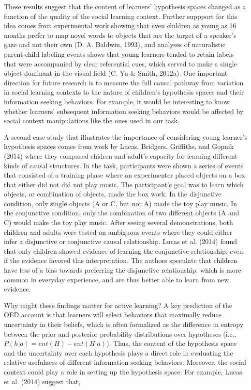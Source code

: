 \documentclass[english,floatsintext,man]{apa6}
\newcounter{author}
\theoremstyle{definition}
\theoremstyle{definition}
\theoremstyle{definition}
\theoremstyle{remark}
\begin{document}
These results suggest that the content of learners' hypothesis spaces
changed as a function of the quality of the social learning context.
Further suppport for this idea comes from experimental work showing that
even children as young as 16 months prefer to map novel words to objects
that are the target of a speaker's gaze and not their own (D. A.
Baldwin, 1993), and analyses of naturalistic parent-child labeling
events shows that young learners tended to retain labels that were
accompanied by clear referential cues, which served to make a single
object dominant in the visual field (C. Yu \& Smith, 2012a). One
important direction for future research is to measure the full causal
pathway from variation in social learning contexts to the nature of
children's hypothesis spaces and their information seeking behaviors.
For example, it would be interesting to know whether learners'
subsequent information seeking behaviors would be affected by social
context manipulations like the ones used in our task.

A second case study that illustrates the importance of considering young
learner's hypothesis spaces comes from work by Lucas, Bridgers,
Griffiths, and Gopnik (2014) where they compared chidren and adult's
capacity for learning different kinds of causal structures. In the task,
participants were shown a series of events that consisted of a training
phase where an experimenter placed objects on a box that either did not
did not play music. The participant's goal was to learn which objects,
or combination of objects, made the box work. In the disjunctive
condition, only single objects (A or C, but not A) made the toy play
music. In the conjunctive condition, only the combination of two
different objects (A and C) would make the toy play music. After seeing
several demonstrations, both children and adults were tested on
ambiguous events where they could either infer a disjunctive or
conjunctive causal relationship. Lucas et al. (2014) found that only
children showed evidence of learning the conjunctive relationship, even
if the evidence favored this interpretation. The authors speculate that
children have less of a bias towards preferring the disjunctive
relationship, which is more common in everyday experience, and are thus
better able to learn from new evidence.

Why might these findings matter for active learning? A key prediction of
the OED account is that learners will select behaviors that maximally
reduce uncertainty in their beliefs, which is often formalized as the
difference in entropy between the prior and posterior probability
distributions over hypotheses (i.e., \(P(h|a) = ent(H) - ent(H|a)\)).
Thus, the content of the hypothesis space and the uncertainty over each
hypothesis plays a direct role in evaluating the relative usefulness of
different information seeking behaviors. Moreover, the social context
could play a role in setting up the hypothesis space. For example, Lucas
et al. (2014) suggest that,
\end{document}
